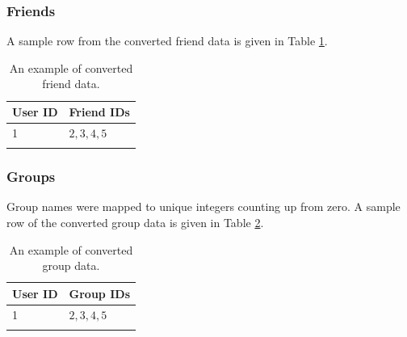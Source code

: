 \subsubsection{Friends}

A sample row from the converted friend data is given in Table \ref{tab:ExampleData_Friend}.

\begin{table}[ht]
    \centering
    \begin{tabular}{l l}
        \toprule
        \textbf{User ID} & \textbf{Friend IDs} \\\midrule
        1 & $2,3,4,5$\\
        \bottomrule\\
    \end{tabular}
    \caption{An example of converted friend data.}
    \label{tab:ExampleData_Friend}
\end{table}

\subsubsection{Groups}

Group names were mapped to unique integers counting up from zero. A sample row of the converted group data is given in Table \ref{tab:ExampleData_Group}.

\begin{table}[ht]
    \centering
    \begin{tabular}{l l}
        \toprule
        \textbf{User ID} & \textbf{Group IDs} \\\midrule
        1 & $2,3,4,5$\\
        \bottomrule\\
    \end{tabular}
    \caption{An example of converted group data.}
    \label{tab:ExampleData_Group}
\end{table}

